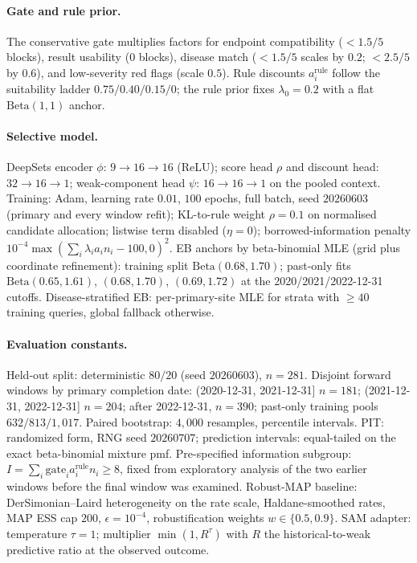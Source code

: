 \documentclass[11pt]{article}
\begin{document}
\paragraph{Gate and rule prior.} The conservative gate multiplies factors for
endpoint compatibility ($<1.5/5$ blocks), result usability ($0$ blocks),
disease match ($<1.5/5$ scales by $0.2$; $<2.5/5$ by $0.6$), and low-severity
red flags (scale $0.5$). Rule discounts $a^{\mathrm{rule}}_i$ follow the
suitability ladder $0.75/0.40/0.15/0$; the rule prior fixes $\lambda_0=0.2$
with a flat $\mathrm{Beta}(1,1)$ anchor.

\paragraph{Selective model.} DeepSets encoder $\phi$: $9 \to 16 \to 16$
(ReLU); score head $\rho$ and discount head: $32 \to 16 \to 1$; weak-component
head $\psi$: $16 \to 16 \to 1$ on the pooled context. Training: Adam, learning
rate $0.01$, $100$ epochs, full batch, seed $20260603$ (primary and every
window refit); KL-to-rule weight $\rho = 0.1$ on normalised candidate
allocation; listwise term disabled ($\eta = 0$); borrowed-information penalty
$10^{-4}\max(\sum_i \lambda_i a_i n_i - 100, 0)^2$. EB anchors by
beta-binomial MLE (grid plus coordinate refinement): training split
$\mathrm{Beta}(0.68, 1.70)$; past-only fits $\mathrm{Beta}(0.65,1.61)$,
$(0.68,1.70)$, $(0.69,1.72)$ at the 2020/2021/2022-12-31 cutoffs.
Disease-stratified EB: per-primary-site MLE for strata with $\ge 40$ training
queries, global fallback otherwise.

\paragraph{Evaluation constants.} Held-out split: deterministic $80/20$
(seed $20260603$), $n = 281$. Disjoint forward windows by primary completion
date: (2020-12-31, 2021-12-31] $n=181$; (2021-12-31, 2022-12-31] $n=204$;
after 2022-12-31, $n=390$; past-only training pools $632/813/1{,}017$.
Paired bootstrap: $4{,}000$ resamples, percentile intervals. PIT: randomized
form, RNG seed $20260707$; prediction intervals: equal-tailed on the exact
beta-binomial mixture pmf. Pre-specified information subgroup: $I = \sum_i
\mathrm{gate}_i a^{\mathrm{rule}}_i n_i \ge 8$, fixed from exploratory
analysis of the two earlier windows before the final window was examined.
Robust-MAP baseline: DerSimonian--Laird heterogeneity on the rate scale,
Haldane-smoothed rates, MAP ESS cap $200$, $\epsilon = 10^{-4}$,
robustification weights $w \in \{0.5, 0.9\}$. SAM adapter: temperature
$\tau = 1$; multiplier $\min(1, R^{\tau})$ with $R$ the
historical-to-weak predictive ratio at the observed outcome.
\end{document}
